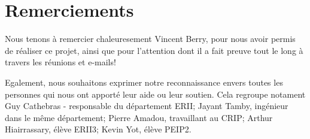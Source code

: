\chapter{Remerciements}
Nous tenons à remercier chaleuresement Vincent Berry, pour nous avoir permis de 
réaliser ce projet, ainsi que pour l'attention dont il a fait preuve tout le long
à travers les réunions et e-mails!

Egalement, nous souhaitons exprimer notre reconnaissance envers toutes les 
personnes qui nous ont apporté leur aide ou leur soutien. Cela regroupe notament
Guy Cathebras - responsable du département ERII; Jayant Tamby, ingénieur dans le
même département; Pierre Amadou, travaillant au CRIP; Arthur Hiairrassary, élève 
ERII3; Kevin Yot, élève PEIP2.

